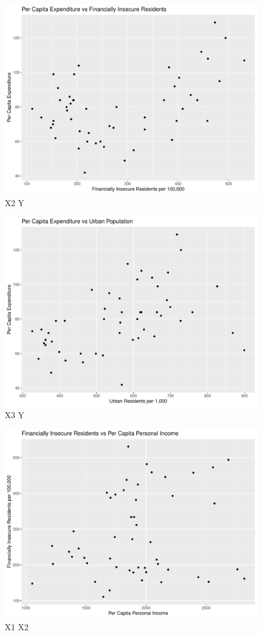 \documentclass[12pt,letterpaper]{article}
\begin{document}
\begin{itemize}
 \begin{figure}[h!]\centering
	\caption{\footnotesize X2 Y}
	\label{fig:5}
	\includegraphics[width=.75\textwidth]{X2_Y.pdf}
\end{figure}

\begin{figure}[h!]\centering
	\caption{\footnotesize X3 Y}
	\label{fig:6}
	\includegraphics[width=.75\textwidth]{X3_Y.pdf}
\end{figure}

\begin{figure}[h!]\centering
	\caption{\footnotesize X1 X2}
	\label{fig:7}
	\includegraphics[width=.75\textwidth]{X1_X2.pdf}
\end{figure}


\end{itemize}
\end{document}
